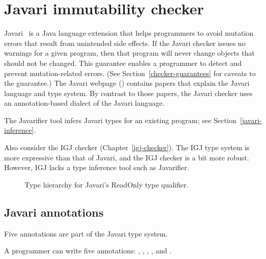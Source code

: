 \htmlhr
\chapter{Javari immutability checker\label{javari-checker}}

Javari~\cite{TschantzE2005,QuinonezTE2008} is a Java language extension that helps programmers to avoid mutation
errors that result from unintended side effects.
If the Javari checker issues no warnings for a given program, then that
program will never change objects that should not be changed.  This
guarantee enables a programmer to detect and prevent mutation-related
errors.  (See Section~\ref{checker-guarantees} for caveats to the guarantee.)
The Javari webpage () contains
papers that explain the Javari language and type system.
By contrast to those papers, the Javari checker uses an annotation-based
dialect of the Javari language.

The Javarifier tool infers Javari types for an existing program; see
Section~\ref{javari-inference}.

Also consider the IGJ checker (Chapter~\ref{igj-checker}).  The IGJ type
system is more expressive than that of Javari, and the IGJ checker is a bit
more robust.  However, IGJ lacks a type inference tool such as Javarifier.



\begin{figure}
\begin{center}
\end{center}
\vspace{-1.5\baselineskip}
\caption{Type hierarchy for Javari's ReadOnly type qualifier.}
\label{fig:javari-hierarchy}
\end{figure}


\section{Javari annotations\label{javary-annotations}}

Five annotations are part of the Javari type system.



A programmer can write five annotations: , ,
, , and .

